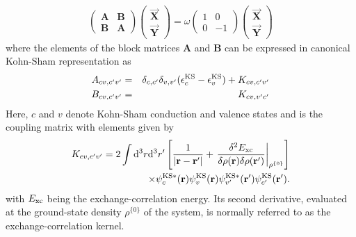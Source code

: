 \documentclass[letterpaper,10pt,english]{sphinxmanual}
\begin{document}
\label{\detokenize{lr_tddft:equation-full-tddft}}\begin{equation}\label{equation:lr_tddft:full_tddft}
\begin{split}\begin{pmatrix} \textbf{A} & \textbf{B} \\ \textbf{B} & \textbf{A}\end{pmatrix}\begin{pmatrix} \vec{\textbf{X}} \\ \vec{\textbf{Y}} \end{pmatrix} = \omega \begin{pmatrix} 1 & 0 \\ 0 & -1 \end{pmatrix}\begin{pmatrix} \vec{\textbf{X}} \\ \vec{\textbf{Y}} \end{pmatrix}\end{split}
\end{equation}
where the elements of the block matrices \(\textbf{A}\) and
\(\textbf{B}\) can be expressed in canonical Kohn-Sham
representation as
\begin{equation*}
\begin{split}\begin{aligned}
A_{cv,c'v'}&=&\delta_{c,c'}\delta_{v,v'}(\epsilon^{\textrm{\scriptsize{KS}}}_{c}-\epsilon^{\textrm{\scriptsize{KS}}}_{v})+K_{cv,c'v'} \\
B_{cv,c'v'}&=&K_{cv, v'c'}\end{aligned}\end{split}
\end{equation*}
Here, \(c\) and \(v\) denote Kohn-Sham conduction and valence
states and  is the coupling matrix with elements given by
\begin{equation*}
\begin{split}\begin{aligned}
 \nonumber
K_{cv,c'v'}=2\int \mathrm{d} ^3 r \mathrm{d} ^3 r'\left[\frac{1}{|\textbf{r}-\textbf{r}'|}+\left. \frac{\delta^2 E_{\textrm{\scriptsize{xc}}}}{\delta\rho(\textbf{r})\delta\rho(\textbf{r}')}\right|_{\rho^{\{0\}}}\right]  \\
\times \psi^{\textrm{\scriptsize{KS}}*}_{c}(\textbf{r})\psi^{\textrm{\scriptsize{KS}}}_{v}(\textbf{r})\psi^{\textrm{\scriptsize{KS}}*}_{v'}(\textbf{r}')\psi^{\textrm{\scriptsize{KS}}}_{c'}(\textbf{r}').\end{aligned}\end{split}
\end{equation*}
with \(E_{\textrm{\scriptsize{xc}}}\) being the
exchange-correlation energy. Its second derivative, evaluated at the
ground-state density \(\rho^{\{0\}}\) of the system, is normally
referred to as the exchange-correlation kernel.
\end{document}
